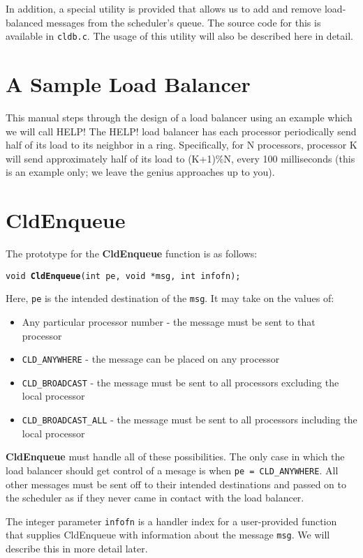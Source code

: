 In addition, a special utility is provided that allows us to add and
remove load-balanced messages from the scheduler's queue.  The source
code for this is available in {\tt cldb.c}.  The usage of this utility
will also be described here in detail.

\section{A Sample Load Balancer}

This manual steps through the design of a load balancer using an
example which we will call HELP!  The HELP! load balancer has each processor
periodically send half of its load to its neighbor in a ring.
Specifically, for N processors, processor K will send approximately half of
its load to (K+1)\%N, every 100 milliseconds (this is an example only;
we leave the genius approaches up to you).

\section{CldEnqueue}

The prototype for the {\bf CldEnqueue} function is as follows:

{\tt void {\bf CldEnqueue}(int pe, void *msg, int infofn);}

Here, {\tt pe} is the intended destination of the {\tt msg}.  It may
take on the values of:

\begin{itemize}
\item Any particular processor number - the message must be sent to
that processor
\item {\tt CLD\_ANYWHERE} - the message can be placed on any processor
\item {\tt CLD\_BROADCAST} - the message must be sent to all processors
excluding the local processor
\item {\tt CLD\_BROADCAST\_ALL} - the message must be sent to all processors
including the local processor
\end{itemize}

{\bf CldEnqueue} must handle all of these possibilities.  The only
case in which the load balancer should get control of a mesage is when
{\tt pe = CLD\_ANYWHERE}.  All other messages must be sent off to their
intended destinations and passed on to the scheduler as if they never
came in contact with the load balancer. 

The integer parameter {\tt infofn} is a handler index for a
user-provided function that supplies CldEnqueue with information about
the message {\tt msg}.  We will describe this in more detail later.

